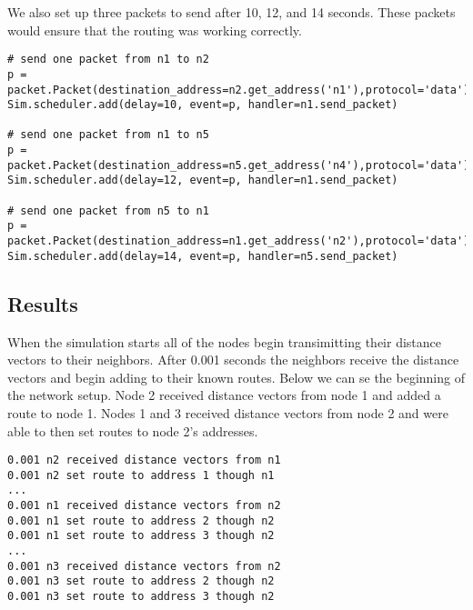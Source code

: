 \documentclass[11pt]{article}
\begin{document}
\vspace{5mm}

We also set up three packets to send after 10, 12, and 14 seconds. These packets would ensure that the routing was working correctly.

\vspace{5mm}

\begin{lstlisting}
# send one packet from n1 to n2
p = packet.Packet(destination_address=n2.get_address('n1'),protocol='data')
Sim.scheduler.add(delay=10, event=p, handler=n1.send_packet)

# send one packet from n1 to n5
p = packet.Packet(destination_address=n5.get_address('n4'),protocol='data')
Sim.scheduler.add(delay=12, event=p, handler=n1.send_packet)

# send one packet from n5 to n1
p = packet.Packet(destination_address=n1.get_address('n2'),protocol='data')
Sim.scheduler.add(delay=14, event=p, handler=n5.send_packet)
\end{lstlisting}

\vspace{5mm}

\subsection{Results}

When the simulation starts all of the nodes begin transimitting their distance vectors to their neighbors. After 0.001 seconds the neighbors receive the distance vectors and begin adding to their known routes. Below we can se the beginning of the network setup. Node 2 received distance vectors from node 1 and added a route to node 1. Nodes 1 and 3 received distance vectors from node 2 and were able to then set routes to node 2's addresses.

\vspace{5mm}

\begin{lstlisting}
0.001 n2 received distance vectors from n1
0.001 n2 set route to address 1 though n1
...
0.001 n1 received distance vectors from n2
0.001 n1 set route to address 2 though n2
0.001 n1 set route to address 3 though n2
...
0.001 n3 received distance vectors from n2
0.001 n3 set route to address 2 though n2
0.001 n3 set route to address 3 though n2
\end{lstlisting}

\vspace{5mm}
\end{document}
